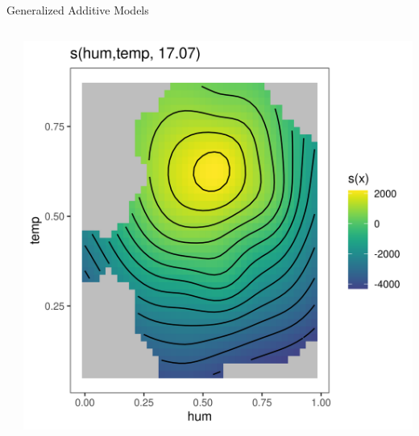 \documentclass[11pt,compress,t,notes=noshow, aspectratio=169, xcolor=table]{beamer}
\begin{document}
\begin{frame}{Generalized Additive Models}
\begin{columns}[T]
\begin{column}{0.55\textwidth}
\tiny

\end{column}
\begin{column}{0.45\textwidth}  %
  \includegraphics[width = \textwidth]{figure/gam_effect_plot.png}
\end{column}
\end{columns}
\end{frame}
\end{document}
